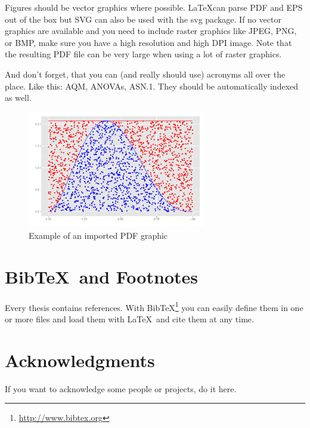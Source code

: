 \documentclass[seminarpaper, grey, english]{mas-thesis-sections}   %
\begin{document}
Figures should be vector graphics where possible. \LaTeX can parse PDF and EPS out of the box but SVG can also be used with the svg package. If no vector graphics are available and you need to include raster graphics like JPEG, PNG, or BMP, make sure you have a high resolution and high DPI image. Note that the resulting PDF file can be very large when using a lot of raster graphics.

And don't forget, that you can (and really should use) acronyms all over the place. Like this: \gls{AQM}, \glspl{ANOVA}, \acrshort{ASN.1}. They should be automatically indexed as well.

\begin{figure}[ht]
	\centering
	\includegraphics[height=5.1cm]{graphics/demo-graphic.pdf}
	\caption{Example of an imported PDF graphic}
	\label{figure:1}
\end{figure}



\section{Bib\TeX\ and Footnotes}

Every thesis contains references. With Bib\TeX\footnote{\url{http://www.bibtex.org}} you can easily define them in one or more files and load them with \LaTeX\ and cite them at any time.\cite{exampleBook}



\section*{Acknowledgments}

If you want to acknowledge some people or projects, do it here.



\printbibliography[heading=bibintoc]
\end{document}
